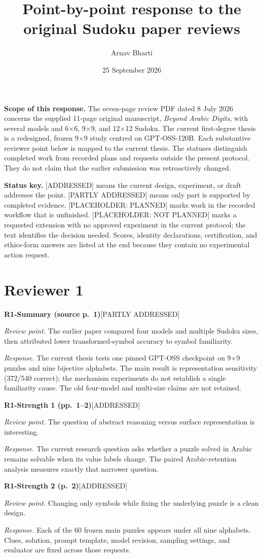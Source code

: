 \documentclass[10pt,a4paper]{article}
\title{Point-by-point response to the original Sudoku paper reviews}
\author{Arnav Bharti}
\date{25 September 2026}
\newcommand{\Done}{\textcolor{done}{\textsf{[ADDRESSED]}}}
\newcommand{\Partial}{\textcolor{pending}{\textsf{[PARTLY ADDRESSED]}}}
\newcommand{\Planned}{\textcolor{pending}{\textsf{[PLACEHOLDER: PLANNED]}}}
\newcommand{\Open}{\textcolor{open}{\textsf{[PLACEHOLDER: NOT PLANNED]}}}
\newcommand{\itemresponse}[4]{%
  \Needspace{5\baselineskip}%
  \par\vspace{0.65\baselineskip}%
  \noindent\textbf{#1}\quad #2\par
  \noindent\emph{Review point.} #3\par
  \noindent\emph{Response.} #4\par
}
\begin{document}
\maketitle

\noindent\textbf{Scope of this response.} The seven-page review PDF dated 8 July 2026 concerns the supplied 11-page original manuscript, \emph{Beyond Arabic Digits}, with several models and 6$\times$6, 9$\times$9, and 12$\times$12 Sudoku. The current first-degree thesis is a redesigned, frozen 9$\times$9 study centred on GPT-OSS-120B. Each substantive reviewer point below is mapped to the current thesis. The statuses distinguish completed work from recorded plans and requests outside the present protocol. They do not claim that the earlier submission was retroactively changed.

\medskip
\noindent\textbf{Status key.} \Done{} means the current design, experiment, or draft addresses the point. \Partial{} means only part is supported by completed evidence. \Planned{} marks work in the recorded workflow that is unfinished. \Open{} marks a requested extension with no approved experiment in the current protocol; the text identifies the decision needed. Scores, identity declarations, certification, and ethics-form answers are listed at the end because they contain no experimental action request.

\section*{Reviewer 1}

\itemresponse{R1-Summary (source p.~1)}{\Partial}{The earlier paper compared four models and multiple Sudoku sizes, then attributed lower transformed-symbol accuracy to symbol familiarity.}{The current thesis tests one pinned GPT-OSS checkpoint on 9$\times$9 puzzles and nine bijective alphabets. The main result is representation sensitivity (372/540 correct); the mechanism experiments do not establish a single familiarity cause. The old four-model and multi-size claims are not retained.}

\itemresponse{R1-Strength 1 (pp.~1--2)}{\Done}{The question of abstract reasoning versus surface representation is interesting.}{The current research question asks whether a puzzle solved in Arabic remains solvable when its value labels change. The paired Arabic-retention analysis measures exactly that narrower question.}

\itemresponse{R1-Strength 2 (p.~2)}{\Done}{Changing only symbols while fixing the underlying puzzle is a clean design.}{Each of the 60 frozen main puzzles appears under all nine alphabets. Clues, solution, prompt template, model revision, sampling settings, and evaluator are fixed across those requests.}
\end{document}

